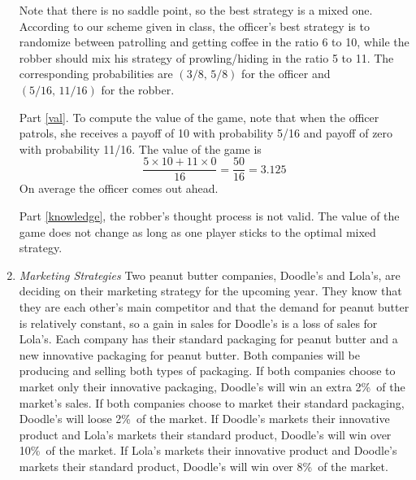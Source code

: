 \begin{enumerate}
\begin{solution}
Note that there is no saddle point, so the best strategy
is a mixed one. According to our scheme given in class, the
officer's best strategy is to randomize between patrolling and getting
coffee in the ratio 6 to 10, while the robber should mix his
strategy of prowling/hiding in the ratio 5 to 11. The corresponding
probabilities are $(3/8,\,5/8)$ for the officer and $(5/16,\,11/16)$
for the robber.

Part \ref{val}. To compute the value of the game, note that
when the officer patrols, she receives a payoff of 10 with
probability 5/16 and payoff of zero with probability 11/16.
The value of the game is
\[ \frac{5 \times 10 + 11 \times 0}{16} = \frac{50}{16} = 3.125 \]
On average the officer comes out ahead.

Part \ref{knowledge}, the robber's thought process is not valid.
The value of the game does not change as long as one player
sticks to the optimal mixed strategy.
\end{solution}

\item \emph{Marketing Strategies} 
Two peanut butter companies, Doodle's and Lola's, are deciding on their marketing strategy for the upcoming year. They know that they are each other's main competitor and that the demand for peanut butter is relatively constant, so a gain in sales for Doodle's is a loss of sales for Lola's. Each company has their standard packaging for peanut butter and a new innovative packaging for peanut butter. Both companies will be producing and selling both types of packaging. 
If both companies choose to market only their innovative packaging, Doodle's will win an extra 2\%\ of the market's sales. 
If both companies choose to market their standard packaging, Doodle's will loose 2\%\ of the market.
If Doodle's markets their innovative product and Lola's markets their standard product, Doodle's will win over 10\%\ of the market.
If Lola's markets their innovative product and Doodle's markets their standard product, Doodle's will win over 8\%\ of the market.
 

\end{enumerate}
